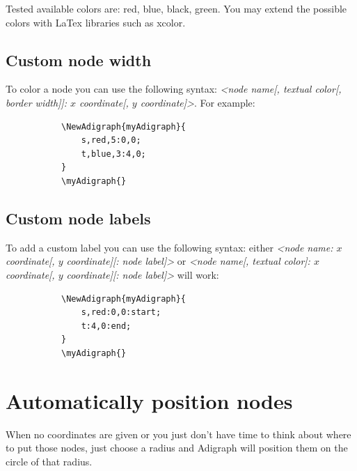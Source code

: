 \documentclass{report}
\begin{document}
Tested available colors are: red, blue, black, green. You may extend the possible colors with LaTex libraries such as xcolor.

\subsection{Custom node width}
To color a node you can use the following syntax: \textit{<node name[, textual color[, border width]]: \(x\) coordinate[, \(y\) coordinate]>}. For example:

\begin{figure}
	\begin{subfigure}{0.49\textwidth}
		\begin{verbatim}
\NewAdigraph{myAdigraph}{
 	s,red,5:0,0;
 	t,blue,3:4,0;
}
\myAdigraph{}
\end{verbatim}
	\end{subfigure}
	\begin{subfigure}{0.49\textwidth}
		\myAdigraph{}
	\end{subfigure}
\end{figure}

\subsection{Custom node labels}
To add a custom label you can use the following syntax: either \textit{<node name: \(x\) coordinate[, \(y\) coordinate][: node label]>} or \textit{<node name[, textual color]: \(x\) coordinate[, \(y\) coordinate][: node label]>} will work:

\begin{figure}
	\begin{subfigure}{0.49\textwidth}
		\begin{verbatim}
\NewAdigraph{myAdigraph}{
 	s,red:0,0:start;
 	t:4,0:end;
}
\myAdigraph{}
\end{verbatim}
	\end{subfigure}
	\begin{subfigure}{0.49\textwidth}
		\myAdigraph{}
	\end{subfigure}
\end{figure}

\section{Automatically position nodes}
When no coordinates are given or you just don't have time to think about where to put those nodes, just choose a radius and Adigraph will position them on the circle of that radius.
\end{document}
